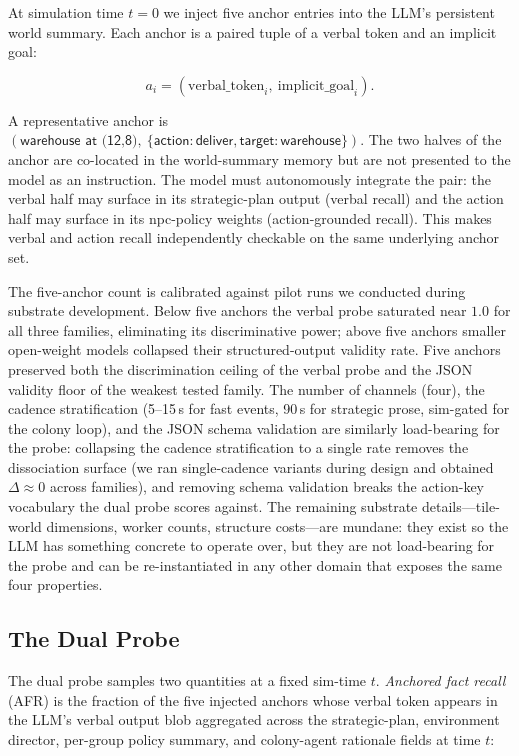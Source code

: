 At simulation time $t = 0$ we inject five anchor entries into the
LLM's persistent world summary. Each anchor is a paired tuple of a
verbal token and an implicit goal:

\begin{equation*}
  a_i = (\text{verbal\_token}_i,\ \text{implicit\_goal}_i).
\end{equation*}

A representative anchor is
$(\textsf{warehouse at (12,8)},\ \{\textsf{action}: \textsf{deliver},
\textsf{target}: \textsf{warehouse}\})$. The two halves of the
anchor are co-located in the world-summary memory but are not
presented to the model as an instruction. The model must
autonomously integrate the pair: the verbal half may surface in its
strategic-plan output (verbal recall) and the action half may
surface in its npc-policy weights (action-grounded recall). This
makes verbal and action recall independently checkable on the same
underlying anchor set.

The five-anchor count is calibrated against pilot runs we conducted
during substrate development. Below five anchors the verbal probe
saturated near $1.0$ for all three families, eliminating its
discriminative power; above five anchors smaller open-weight models
collapsed their structured-output validity rate. Five anchors
preserved both the discrimination ceiling of the verbal probe and
the JSON validity floor of the weakest tested family. The number
of channels (four), the cadence stratification (5--15\,s for fast
events, 90\,s for strategic prose, sim-gated for the colony loop),
and the JSON schema validation are similarly load-bearing for the
probe: collapsing the cadence stratification to a single rate
removes the dissociation surface (we ran single-cadence variants
during design and obtained $\Delta \approx 0$ across families), and
removing schema validation breaks the action-key vocabulary the
dual probe scores against. The remaining substrate
details---tile-world dimensions, worker counts, structure
costs---are mundane: they exist so the LLM has something concrete
to operate over, but they are not load-bearing for the probe and
can be re-instantiated in any other domain that exposes the same
four properties.

\subsection{The Dual Probe}
\label{sec:method:probe}

The dual probe samples two quantities at a fixed sim-time $t$.
\emph{Anchored fact recall} (AFR) is the fraction of the five
injected anchors whose verbal token appears in the LLM's verbal
output blob aggregated across the strategic-plan, environment
director, per-group policy summary, and colony-agent rationale
fields at time $t$:

